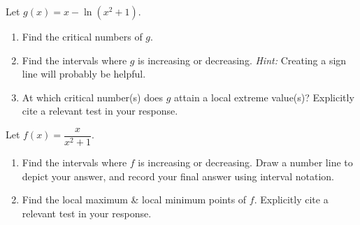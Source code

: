 \documentclass[10pt]{article}
\begin{document}
\example Let $g(x)=x-\ln(x^2+1)$.
%
\begin{enumerate}
\item[(a)] Find the critical numbers of $g$.


\item[(b)] Find the intervals where $g$ is increasing or decreasing. {\em Hint:} Creating a sign line will probably be helpful.



\item[(c)] At which critical number(s) does $g$ attain a local extreme value(s)? Explicitly cite a relevant test in your response.



\end{enumerate}

\newpage

\exercise Let $f(x)=\dfrac{x}{x^2+1}$.
\begin{enumerate}
\item[(a)]  Find the intervals where $f$ is increasing or decreasing. Draw a number line to depict your answer, and record your final answer using interval notation. \\


\item[(b)]  Find the local maximum \& local minimum points of $f$. Explicitly cite a relevant test in your response. \\


\end{enumerate}
\end{document}
